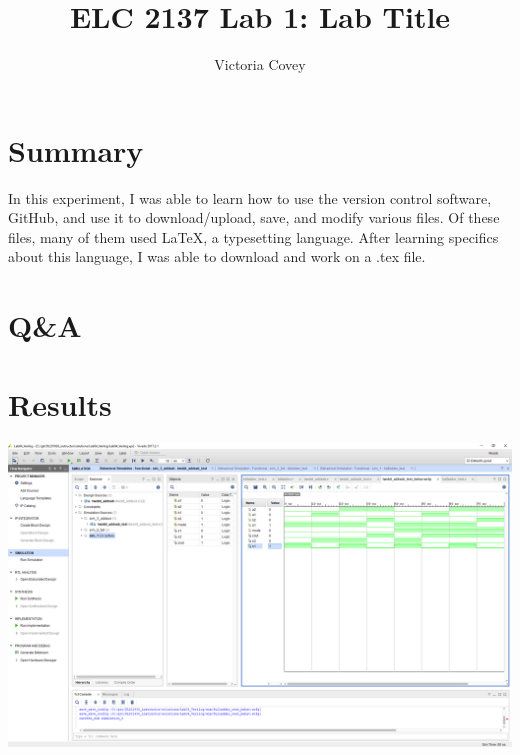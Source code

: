 \documentclass[11pt]{article}
\begin{document}
\title{ELC 2137 Lab 1: Lab Title}
\author{Victoria Covey}

\maketitle


\section*{Summary}

In this experiment, I was able to learn how to use the version control software, GitHub, and use it to download/upload, save, and modify various files. Of these files, many of them used LaTeX, a typesetting language. After learning specifics about this language, I was able to download and work on a .tex file.


\section*{Q\&A}

\section*{Results}

\includegraphics[width=01\textwidth,trim=19cm 15.5cm 0.6cm 4cm,clip]{lab1_example_screenshot}
\end{document}
